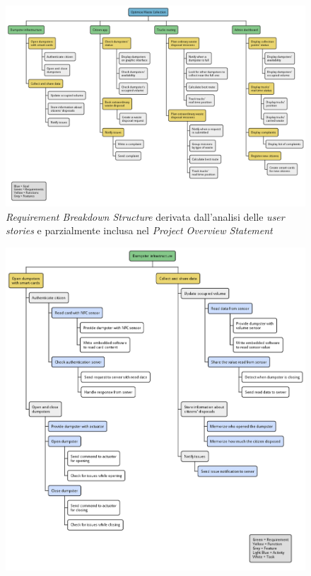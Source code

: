 \begin{figure}[H]
    \centering
    \includegraphics[width=\textwidth]{uml/requirement-breakdown-structure.pm}
    \caption{\textit{Requirement Breakdown Structure} derivata dall'analisi delle \textit{user stories} e parzialmente inclusa nel \textit{Project Overview Statement}  }
    \label{fig:uml/requirement-breakdown-structure}
\end{figure}


\begin{figure}[H]
    \centering
    \includegraphics[width=\textwidth]{uml/wbs-dumpster-infrastructure.pm}
    \caption{}
    \label{fig:uml/wbs-dumpster-infrastructure}
\end{figure}


